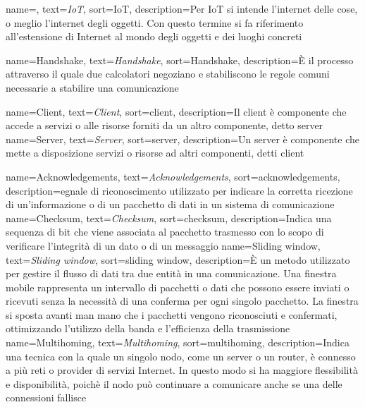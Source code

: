 
 {
    name=,
    text=\emph{IoT},
    sort=IoT,
    description={Per IoT si intende l'internet delle cose, o meglio l'internet degli oggetti. Con questo termine si fa riferimento all'estensione di Internet al mondo degli oggetti e dei luoghi concreti}
}

 {
    name=Handshake,
    text=\emph{Handshake},
    sort=Handshake,
    description={È il processo attraverso il quale due calcolatori negoziano e stabiliscono le regole comuni necessarie a stabilire una comunicazione}
}

 {
    name=Client,
    text=\emph{Client},
    sort=client,
    description={Il client è componente che accede a servizi o alle risorse forniti da un altro componente, detto \gls{server}}
}
 {
    name=Server,
    text=\emph{Server},
    sort=server,
    description={Un server è componente che mette a disposizione servizi o risorse ad altri componenti, detti \gls{client}}
}

 {
    name=Acknowledgements,
    text=\emph{Acknowledgements},
    sort=acknowledgements,
    description={egnale di riconoscimento utilizzato per indicare la corretta ricezione di un'informazione o di un pacchetto di dati in un sistema di comunicazione}
}
 {
    name=Checksum,
    text=\emph{Checksum},
    sort=checksum,
    description={Indica una sequenza di bit che viene associata al pacchetto trasmesso con lo scopo di verificare l'integrità di un dato o di un messaggio}
}
 {
    name=Sliding window,
    text=\emph{Sliding window},
    sort=sliding window,
    description={È un metodo utilizzato per gestire il flusso di dati tra due entità in una comunicazione. Una finestra mobile rappresenta un intervallo di pacchetti o dati che possono essere inviati o ricevuti senza la necessità di una conferma per ogni singolo pacchetto.
    La finestra si sposta avanti man mano che i pacchetti vengono riconosciuti e confermati, ottimizzando l'utilizzo della banda e l'efficienza della trasmissione}
}
 {
    name=Multihoming,
    text=\emph{Multihoming},
    sort=multihoming,
    description={Indica una tecnica con la quale un singolo nodo, come un server o un router, è connesso a più reti o provider di servizi Internet. In questo modo si ha maggiore flessibilità e disponibilità, poichè il nodo può continuare a comunicare anche se una delle connessioni fallisce}
}

